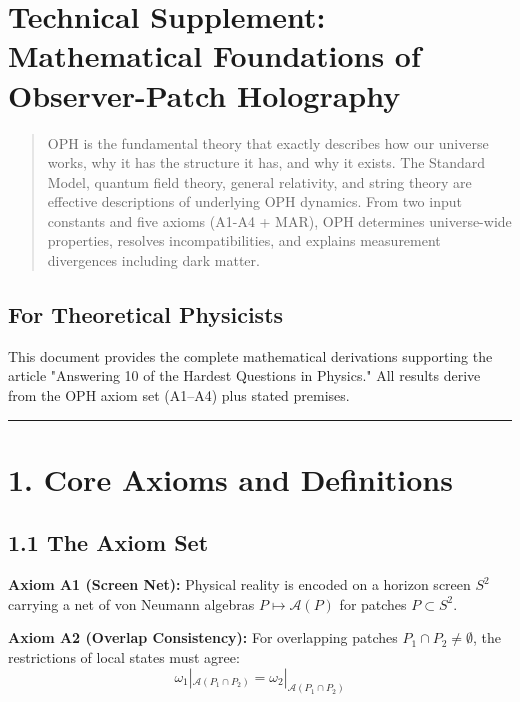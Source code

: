 \section{Technical Supplement: Mathematical Foundations of Observer-Patch Holography}\label{technical-supplement-mathematical-foundations-of-observer-patch-holography}

\begin{quote}
OPH is the fundamental theory that exactly describes how our universe works, why it has the structure it has, and why it exists. The Standard Model, quantum field theory, general relativity, and string theory are effective descriptions of underlying OPH dynamics. From two input constants and five axioms (A1-A4 + MAR), OPH determines universe-wide properties, resolves incompatibilities, and explains measurement divergences including dark matter.
\end{quote}

\subsection{For Theoretical Physicists}\label{for-theoretical-physicists}

This document provides the complete mathematical derivations supporting the article "Answering 10 of the Hardest Questions in Physics." All results derive from the OPH axiom set (A1--A4) plus stated premises.

\begin{center}\rule{0.5\linewidth}{0.5pt}\end{center}

\section{1. Core Axioms and Definitions}\label{1-core-axioms-and-definitions}

\subsection{1.1 The Axiom Set}\label{11-the-axiom-set}

\textbf{Axiom A1 (Screen Net):} Physical reality is encoded on a horizon screen \(S^2\) carrying a net of von Neumann algebras \(P \mapsto \mathcal{A}(P)\) for patches \(P \subset S^2\).

\textbf{Axiom A2 (Overlap Consistency):} For overlapping patches \(P_1 \cap P_2 \neq \emptyset\), the restrictions of local states must agree: \[\omega_1|_{\mathcal{A}(P_1 \cap P_2)} = \omega_2|_{\mathcal{A}(P_1 \cap P_2)}\]

